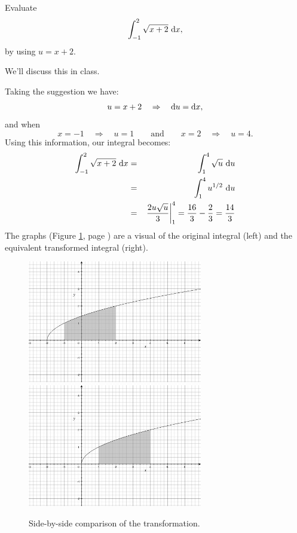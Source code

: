 \documentclass[12pt,addpoints, answers, fleqn]{exam}
\begin{document}
\begin{questions}
\question Evaluate
\[
\int_{-1}^{2} \sqrt{x+2}  \ {\rm{d}} x,
\]
by using $u = x+2$.

\begin{solution}
We'll discuss this in class.

Taking the suggestion we have:
\[
u = x+2 \quad \Rightarrow \quad {\rm{d}} u = {\rm{d}} x,
\]
and when
\[
x=-1 \quad \Rightarrow \quad u = 1 \qquad \mbox{and}\qquad
x=2 \quad \Rightarrow \quad u = 4. 
\]
Using this information, our integral becomes:
\begin{eqnarray*}
\int_{-1}^{2} \sqrt{x+2}  \ {\rm{d}} x &=& \int_{1}^{4} \sqrt{u}  \ {\rm{d}} u\\
&=& \int_{1}^{4} u^{1/2} \ {\rm{d}} u\\
&=& \left. \frac{ 2 u \sqrt{u} }{3} \right|_1^4 = \frac{16}{3} - \frac{2}{3} =\frac{14}{3}
\end{eqnarray*}
The graphs (Figure \ref{fig:graph3001}, page \pageref{fig:graph3001}) are a visual of the original integral (left) and the equivalent transformed integral (right). 
\end{solution}
\begin{figure}[htbp] %
   \centering
   \includegraphics[width=3in]{./graphics/graph3001.pdf}
   \includegraphics[width=3in]{./graphics/graph3002.pdf} 
   \caption{Side-by-side comparison of the transformation.}
   \label{fig:graph3001}
\end{figure}



\end{questions}
\end{document}
